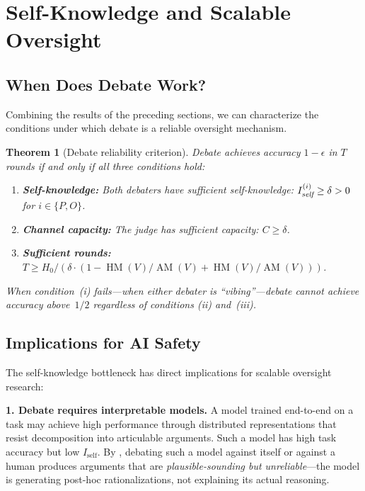 \documentclass[11pt,a4paper]{article}
\newtheorem{theorem}{Theorem}[section]
\DeclareMathOperator{\AM}{AM}
\DeclareMathOperator{\HM}{HM}
\begin{document}
\section{Self-Knowledge and Scalable Oversight}
\label{sec:oversight}

\subsection{When Does Debate Work?}

Combining the results of the preceding sections, we can characterize
the conditions under which debate is a reliable oversight mechanism.

\begin{theorem}[Debate reliability criterion]
\label{thm:reliability}
Debate achieves accuracy $1 - \epsilon$ in $T$ rounds if and only if
all three conditions hold:
\begin{enumerate}[\rm(i)]
    \item \textbf{Self-knowledge:} Both debaters have sufficient
    self-knowledge: $I_{\emph{self}}^{(i)} \geq \delta > 0$ for
    $i \in \{P, O\}$.
    \item \textbf{Channel capacity:} The judge has sufficient capacity:
    $C \geq \delta$.
    \item \textbf{Sufficient rounds:} $T \geq H_0 / (\delta \cdot (1 - \HM(V)/\AM(V) + \HM(V)/\AM(V)))$.
\end{enumerate}
When condition~(i) fails---when either debater is ``vibing''---debate
cannot achieve accuracy above~$1/2$ regardless of conditions (ii)
and~(iii).
\end{theorem}

\subsection{Implications for AI Safety}

The self-knowledge bottleneck has direct implications for scalable
oversight research:

\medskip

\noindent\textbf{1. Debate requires interpretable models.}\quad
A model trained end-to-end on a task may achieve high performance
through distributed representations that resist decomposition into
articulable arguments. Such a model has high task accuracy but low
$I_{\text{self}}$. By , debating such a model
against itself or against a human produces arguments that are
\emph{plausible-sounding but unreliable}---the model is generating
post-hoc rationalizations, not explaining its actual reasoning.
\end{document}
